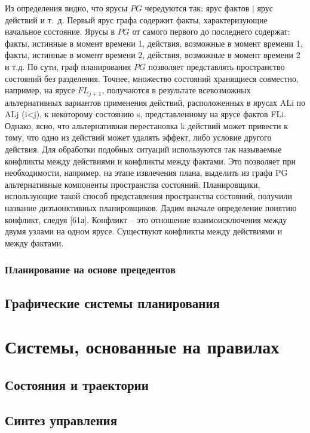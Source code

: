 \documentclass[b5paper,11pt]{book}
\begin{document}
	Из определения видно, что ярусы $PG$ чередуются так: ярус фактов $|$ ярус действий и т.~д. Первый ярус графа содержит факты, характеризующие начальное состояние. Ярусы в $PG$ от самого первого до последнего содержат: факты, истинные в момент времени 1, действия, возможные в момент времени 1, факты, истинные в момент времени 2, действия, возможные в момент времени 2 и т.д. По сути, граф планирования $PG$ позволяет представлять пространство состояний без разделения. Точнее, множество состояний хранящиеся совместно, например, на ярусе $FL_{j+1}$, получаются в результате всевозможных альтернативных вариантов применения действий, расположенных в ярусах ALi по ALj (i<j), к некоторому состоянию s, представленному на ярусе фактов FLi. Однако, ясно, что альтернативная перестановка k действий может привести к тому, что одно из действий может удалять эффект, либо условие другого действия. Для обработки подобных ситуаций используются так называемые  конфликты между действиями и конфликты между фактами. Это позволяет при необходимости, например, на этапе извлечения плана, выделить из графа PG альтернативные компоненты пространства состояний.
	Планировщики, использующие такой способ представления пространства состояний, получили название дизъюнктивных планировщиков.
	Дадим вначале определение понятию конфликт, следуя [61а].
	Конфликт – это отношение взаимоисключения между двумя узлами на одном ярусе. Существуют конфликты между действиями и между фактами.
	
		
	\subsection{Планирование на основе прецедентов}
	
	\section{Графические системы планирования}
		
		
	
	\chapter{Системы, основанные на правилах}
	
	\section{Состояния и траектории}
	\section{Синтез управления}
\end{document}
